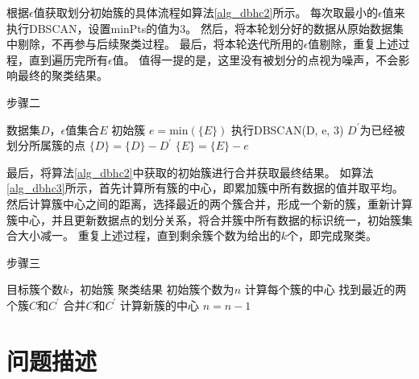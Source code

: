 根据$ \epsilon $值获取划分初始簇的具体流程如算法\ref{alg_dbhc2}所示。
每次取最小的$\epsilon$值来执行DBSCAN，设置minPts的值为3。
然后，将本轮划分好的数据从原始数据集中剔除，不再参与后续聚类过程。
最后，将本轮迭代所用的$\epsilon$值剔除，重复上述过程，直到遍历完所有$\epsilon$值。
值得一提的是，这里没有被划分的点视为噪声，不会影响最终的聚类结果。
\begin{algorithm}[htbp]
	\renewcommand{\algorithmicrequire}{\textbf{输入:}}
	\renewcommand{\algorithmicensure}{\textbf{输出:}}
	\caption{步骤二}
	\label{alg_dbhc2}
	\begin{algorithmic}[1]
		\REQUIRE 数据集$ D $，$\epsilon$值集合$ E $
		\ENSURE 初始簇
		\STATE $ e = \text{min}(\{E\}) $
		\STATE 执行DBSCAN(D, e, 3)
		\STATE $ D^{\prime} $为已经被划分所属簇的点
		\STATE $ \{D\} = \{D\} - D^{\prime} $
		\STATE $ \{E\} = \{E\} - e $
		\ENDWHILE
	\end{algorithmic}
\end{algorithm}

最后，将算法\ref{alg_dbhc2}中获取的初始簇进行合并获取最终结果。
如算法\ref{alg_dbhc3}所示，首先计算所有簇的中心，即累加簇中所有数据的值并取平均。
然后计算簇中心之间的距离，选择最近的两个簇合并，形成一个新的簇，重新计算簇中心，并且更新数据点的划分关系，将合并簇中所有数据的标识统一，初始簇集合大小减一。
重复上述过程，直到剩余簇个数为给出的$ k $个，即完成聚类。

\begin{algorithm}[htbp]
	\renewcommand{\algorithmicrequire}{\textbf{输入:}}
	\renewcommand{\algorithmicensure}{\textbf{输出:}}
	\caption{步骤三}
	\label{alg_dbhc3}
	\begin{algorithmic}[1]
		\REQUIRE 目标簇个数$ k $，初始簇
		\ENSURE 聚类结果
		\STATE 初始簇个数为$ n $
		\STATE 计算每个簇的中心
		\STATE 找到最近的两个簇$ C $和$ C^{\prime} $
		\STATE 合并$ C $和$ C^{\prime} $
		\STATE 计算新簇的中心
		\STATE $ n = n-1 $
		\ENDWHILE
	\end{algorithmic}
\end{algorithm}
\section{问题描述}
\label{s4-wenti}
